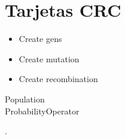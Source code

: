 \section{Tarjetas CRC}

\begin{crccard}[tb:mytable]
    \crcresp
    {
       \begin{itemize}
          \item Create gens
          \item Create mutation
          \item Create recombination
       \end{itemize}
    }
   \crccolab
   {
      Population\\
      ProbabilityOperator\\
   }
 \end{crccard}
.
